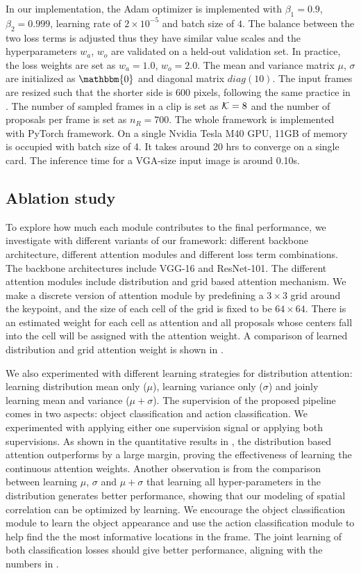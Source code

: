 In our implementation, the Adam optimizer \cite{kingma2014adam} is implemented with $\beta_1=0.9$, $\beta_2=0.999$, learning rate of $2\times 10^{-5}$ and batch size of $4$. The balance between the two loss terms is adjusted thus they have similar value scales and the hyperparameters $w_a$, $w_o$ are validated on a held-out validation set. In practice, the loss weights are set as $w_a=1.0$, $w_o=2.0$. The mean and variance matrix $\mu$, $\sigma$ are initialized as $\mathbbm{0}$ and diagonal matrix $diag(10)$. The input frames are resized such that the shorter side is 600 pixels, following the same practice in 
\cite{ren2015faster}. The number of sampled frames in a clip is set as ${\mathcal K}=8$ and the number of proposals per frame is set as $n_R=700$. The whole framework is implemented with PyTorch framework. On a single Nvidia Tesla M40 GPU, 11GB of memory is occupied with batch size of 4. It takes around 20 hrs to converge on a single card. The inference time for a VGA-size input image is around 0.10s.

\subsection{Ablation study}
To explore how much each module contributes to the final performance, we investigate with different variants of our framework: different backbone architecture, different attention modules and different loss term combinations. The backbone architectures include VGG-16 and ResNet-101. The different attention modules include distribution and grid based attention mechanism. We make a discrete version of attention module by predefining a $3\times 3$ grid around the keypoint, and the size of each cell of the grid is fixed to be $64\times 64$. There is an estimated weight for each cell as attention and all proposals whose centers fall into the cell will be assigned with the attention weight. A comparison of learned distribution and grid attention weight is shown in \figref{}. 

We also experimented with different learning strategies for distribution attention: learning distribution mean only ($\mu$), learning variance only ($\sigma$) and joinly learning mean and variance ($\mu+\sigma$). The supervision of the proposed pipeline comes in two aspects: object classification and action classification. We experimented with applying either one supervision signal or applying both supervisions. As shown in the quantitative results in , the distribution based attention outperforms by a large margin, proving the effectiveness of learning the continuous attention weights. Another observation is from the comparison between learning $\mu$, $\sigma$ and $\mu+\sigma$ that learning all hyper-parameters in the distribution generates better performance, showing that our modeling of spatial correlation can be optimized by learning.  We encourage the object classification module to learn the object appearance and use the action classification module to help find the the most informative locations in the frame. The joint learning of both classification losses should give better performance, aligning with the numbers in .

